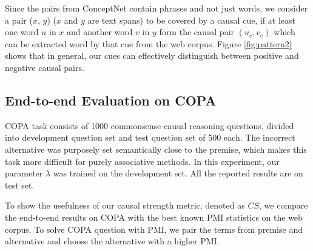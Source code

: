 \documentclass[letterpaper]{article}
\newcommand{\figref}[1]{Figure \ref{#1}}
\begin{document}
Since the pairs from ConceptNet contain
phrases and not just words, we consider a pair ($x$, $y$)
($x$ and $y$ are text spans) to be covered by a
causal cue, if at least one word $u$ in $x$ and another word $v$ in
$y$ form the causal pair $(u_c,v_e)$ which can be extracted word by that cue
from the web corpus.
\figref{fig:pattern2} shows that in general, our cues can
effectively distinguish between positive and negative causal pairs.

\subsection{End-to-end Evaluation on COPA}
COPA task consists of 1000 commonsense causal reasoning questions, divided into
development question set and test question set of 500 each.
The incorrect alternative was purposely set semantically
close to the premise, which makes this task more difficult for
purely associative methods. In this experiment, our parameter $\lambda$
was trained on the development set.
All the reported results are on test set.

To show the usefulness of our causal strength metric, denoted as $CS$,
we compare the end-to-end results on COPA with the
best known PMI statistics on the web corpus.
To solve COPA question with PMI, we pair the terms from
premise and alternative and choose the alternative
with a higher PMI.
\end{document}
